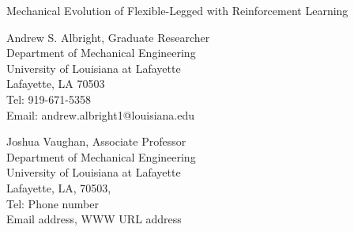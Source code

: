 \begin{center}
{\footnotesize{\hvb
Mechanical Evolution of Flexible-Legged with Reinforcement Learning
}}

\vspace{10pt}
\setlength{\baselineskip}{11pt}

{\footnotesize
{\hvb Andrew S. Albright}, {\hv Graduate Researcher} \\
{\hv
Department of Mechanical Engineering \\
University of Louisiana at Lafayette\\
Lafayette, LA 70503\\
Tel: 919-671-5358\\ 
Email: andrew.albright1@louisiana.edu\\
}}

\vspace{10pt}
{\footnotesize
{\hvb Joshua Vaughan}, {\hv Associate Professor} \\
{\hv
Department of Mechanical Engineering \\
University of Louisiana at Lafayette\\
Lafayette, LA, 70503, \\
Tel: Phone number\\ 
Email address, WWW URL address\
}}


\end{center}

